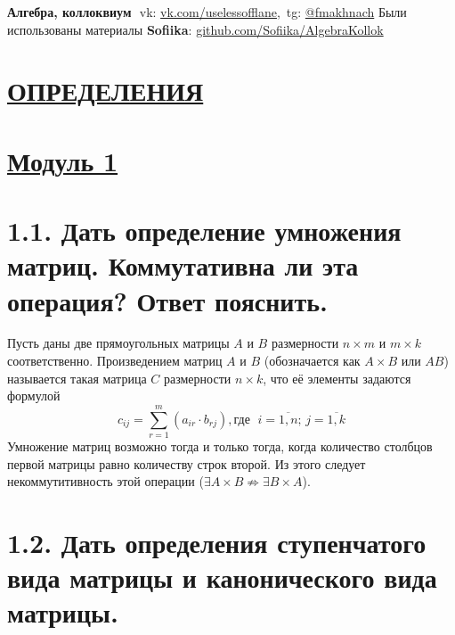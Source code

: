 \documentclass{article}
\begin{document}
\textbf{\huge Алгебра, коллоквиум}
\Large
\newline $ $
\newline vk: \href{https://vk.com/uselessofflane}{\color{blue}vk.com/uselessofflane},\, tg: \href{https://t.me/fmakhnach}{\color{blue}@fmakhnach}
\newline Были использованы материалы \textbf{Sofiika}: \href{https://github.com/Sofiika/AlgebraKollok}{\color{blue} github.com/Sofiika/AlgebraKollok }

\tableofcontents

\newpage
{}
\section*{\LARGE\centering \underline{ОПРЕДЕЛЕНИЯ}}

\section*{\LARGE\centering \underline{Модуль 1}}

\section*{\LARGE 1.1. Дать определение умножения матриц. Коммутативна ли эта операция? Ответ пояснить.}

Пусть даны две прямоугольных матрицы $A$ и $B$ размерности $n \times m$ и $m \times k$ соответственно. Произведением матриц $A$ и $B$ (обозначается как $A \times B$ или $AB$) называется такая матрица $C$ размерности $n \times k$, что её элементы задаются формулой 
$$
c_{ij} = \sum_{r = 1}^{m}(a_{ir}\cdot b_{rj}), \mbox{где }\; i = \overline{1, n};\, j = \overline{1, k}
$$
Умножение матриц возможно тогда и только тогда, когда количество столбцов первой матрицы равно количеству строк второй. Из этого следует некоммутитивность этой операции ($\exists A \times B \not\Rightarrow \exists B \times A$).

\section*{\LARGE 1.2. Дать определения ступенчатого вида матрицы и канонического вида матрицы. }
\end{document}
